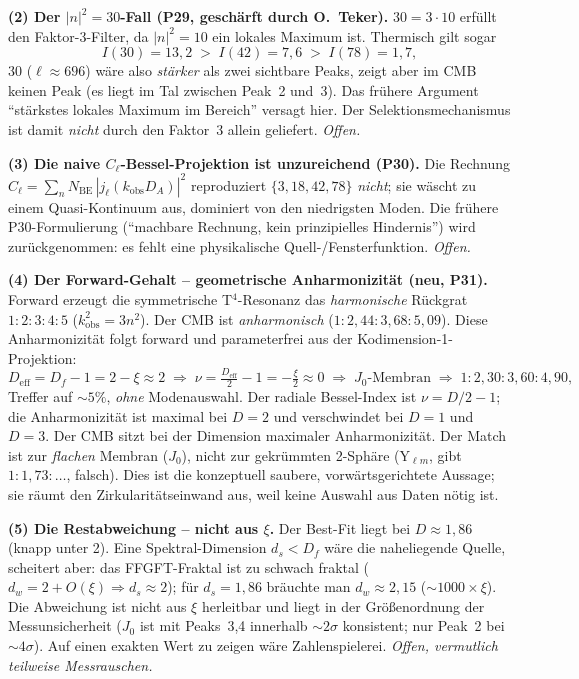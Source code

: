\textbf{(2) Der $|n|^2=30$-Fall (P29, geschärft durch O.~Teker).}
$30=3\cdot10$ erfüllt den Faktor-3-Filter, da $|n|^2=10$ ein lokales
Maximum ist. Thermisch gilt sogar
\[
  I(30)=13{,}2 \;>\; I(42)=7{,}6 \;>\; I(78)=1{,}7,
\]
$30$ ($\ell\approx696$) wäre also \emph{stärker} als zwei sichtbare Peaks,
zeigt aber im CMB keinen Peak (es liegt im Tal zwischen Peak~2 und~3). Das
frühere Argument ``stärkstes lokales Maximum im Bereich'' versagt hier. Der
Selektionsmechanismus ist damit \emph{nicht} durch den Faktor~3 allein
geliefert. \emph{Offen.}

\textbf{(3) Die naive $C_\ell$-Bessel-Projektion ist unzureichend (P30).}
Die Rechnung $C_\ell=\sum_n N_\mathrm{BE}\,|j_\ell(k_\mathrm{obs}D_A)|^2$
reproduziert $\{3,18,42,78\}$ \emph{nicht}; sie wäscht zu einem
Quasi-Kontinuum aus, dominiert von den niedrigsten Moden. Die frühere
P30-Formulierung (``machbare Rechnung, kein prinzipielles Hindernis'') wird
zurückgenommen: es fehlt eine physikalische Quell-/Fensterfunktion. \emph{Offen.}

\textbf{(4) Der Forward-Gehalt -- geometrische Anharmonizität (neu, P31).}
Forward erzeugt die symmetrische T$^4$-Resonanz das \emph{harmonische}
Rückgrat $1:2:3:4:5$ ($k^2_\mathrm{obs}=3n^2$). Der CMB ist
\emph{anharmonisch} ($1:2{,}44:3{,}68:5{,}09$). Diese Anharmonizität folgt
forward und parameterfrei aus der Kodimension-1-Projektion:
\[
  D_\mathrm{eff}=D_f-1=2-\xi\approx2
  \;\Rightarrow\;
  \nu=\tfrac{D_\mathrm{eff}}{2}-1=-\tfrac{\xi}{2}\approx0
  \;\Rightarrow\;
  J_0\text{-Membran}
  \;\Rightarrow\;
  1:2{,}30:3{,}60:4{,}90,
\]
Treffer auf $\sim5\%$, \emph{ohne} Modenauswahl. Der radiale Bessel-Index
ist $\nu=D/2-1$; die Anharmonizität ist maximal bei $D=2$ und verschwindet
bei $D=1$ und $D=3$. Der CMB sitzt bei der Dimension maximaler
Anharmonizität. Der Match ist zur \emph{flachen} Membran ($J_0$), nicht zur
gekrümmten 2-Sphäre (Y$_{\ell m}$, gibt $1:1{,}73:\ldots$, falsch). Dies ist
die konzeptuell saubere, vorwärtsgerichtete Aussage; sie räumt den
Zirkularitätseinwand aus, weil keine Auswahl aus Daten nötig ist.

\textbf{(5) Die Restabweichung -- nicht aus $\xi$.}
Der Best-Fit liegt bei $D\approx1{,}86$ (knapp unter 2). Eine
Spektral-Dimension $d_s<D_f$ wäre die naheliegende Quelle, scheitert aber:
das FFGFT-Fraktal ist zu schwach fraktal ($d_w=2+O(\xi)\Rightarrow
d_s\approx2$); für $d_s=1{,}86$ bräuchte man $d_w\approx2{,}15$
($\sim1000\times\xi$). Die Abweichung ist nicht aus $\xi$ herleitbar und
liegt in der Größenordnung der Messunsicherheit ($J_0$ ist mit Peaks~3,4
innerhalb $\sim2\sigma$ konsistent; nur Peak~2 bei $\sim4\sigma$). Auf einen
exakten Wert zu zeigen wäre Zahlenspielerei. \emph{Offen, vermutlich
teilweise Messrauschen.}

